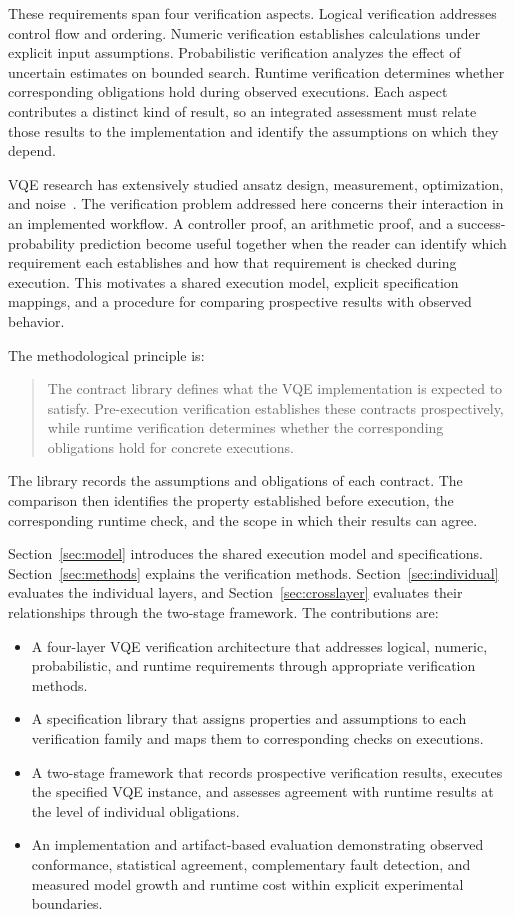 \documentclass[conference]{IEEEtran}
\begin{document}
These requirements span four verification aspects. Logical verification addresses control flow and ordering. Numeric verification establishes calculations under explicit input assumptions. Probabilistic verification analyzes the effect of uncertain estimates on bounded search. Runtime verification determines whether corresponding obligations hold during observed executions. Each aspect contributes a distinct kind of result, so an integrated assessment must relate those results to the implementation and identify the assumptions on which they depend.

VQE research has extensively studied ansatz design, measurement, optimization, and noise~\cite{tilly2022}. The verification problem addressed here concerns their interaction in an implemented workflow. A controller proof, an arithmetic proof, and a success-probability prediction become useful together when the reader can identify which requirement each establishes and how that requirement is checked during execution. This motivates a shared execution model, explicit specification mappings, and a procedure for comparing prospective results with observed behavior.

The methodological principle is:
\begin{quote}
The contract library defines what the VQE implementation is expected to satisfy. Pre-execution verification establishes these contracts prospectively, while runtime verification determines whether the corresponding obligations hold for concrete executions.
\end{quote}
The library records the assumptions and obligations of each contract. The comparison then identifies the property established before execution, the corresponding runtime check, and the scope in which their results can agree.

Section~\ref{sec:model} introduces the shared execution model and specifications. Section~\ref{sec:methods} explains the verification methods. Section~\ref{sec:individual} evaluates the individual layers, and Section~\ref{sec:crosslayer} evaluates their relationships through the two-stage framework. The contributions are:
\begin{itemize}
\item A four-layer VQE verification architecture that addresses logical, numeric, probabilistic, and runtime requirements through appropriate verification methods.
\item A specification library that assigns properties and assumptions to each verification family and maps them to corresponding checks on executions.
\item A two-stage framework that records prospective verification results, executes the specified VQE instance, and assesses agreement with runtime results at the level of individual obligations.
\item An implementation and artifact-based evaluation demonstrating observed conformance, statistical agreement, complementary fault detection, and measured model growth and runtime cost within explicit experimental boundaries.
\end{itemize}
\end{document}
